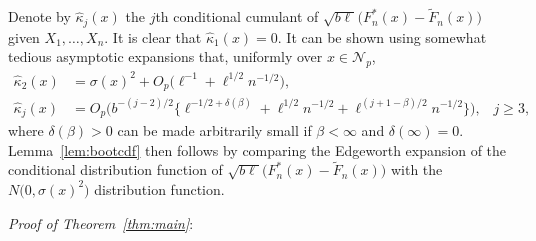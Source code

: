 \documentclass[a4paper, 12pt]{article}
\theoremstyle{plain}
\theoremstyle{definition}
\begin{document}
Denote by $\hat\kappa_j(x)$ the $j$th conditional cumulant of
$\sqrt{b\ell}\big(F^*_n(x)-\tilde{F}_n(x)\big)$ given $X_1,\ldots,X_n$. It is clear that
$\hat\kappa_1(x)=0$. It can be shown using somewhat tedious asymptotic
 expansions that, uniformly over $x\in\mathscr{N}_p$,
\begin{align*}
\hat\kappa_2(x)&=\sigma(x)^2+O_p\big(\ell^{-1}+\ell^{1/2}n^{-1/2}\big),\\
\hat\kappa_j(x)&=O_p\Big(b^{-(j-2)/2}
\big\{\ell^{-1/2+\delta(\beta)}+\ell^{1/2}n^{-1/2}+\ell^{(j+1-\beta)/2}n^{-1/2}\big\}\Big),
\;\;\;j\ge 3,
\end{align*}
where $\delta(\beta)>0$ can be made arbitrarily small if $\beta<\infty$ and $\delta(\infty)=0$.
Lemma~\ref{lem:bootcdf} then follows by comparing the Edgeworth expansion of
the conditional distribution function of $\sqrt{b\ell}\big(F^*_n(x)-\tilde{F}_n(x)\big)$ with
the $N\big(0,\sigma(x)^2\big)$ distribution function.

\noindent
{\it Proof of Theorem~\ref{thm:main}\/}:
\end{document}
